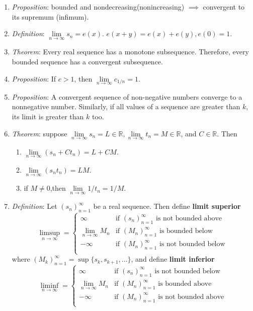 \message{ !name(cheatsheet.tex)}\documentclass{article}
\newcommand{\seqn}[1]{(#1)^\infty_{n=1}}
\newcommand{\real}{\mathbb{R}}
\newcommand{\ntoinf}{\limits_{n\rightarrow\infty}}
\newcommand{\limn}[1]{\lim\ntoinf #1}
\begin{document}
\begin{multicols*}{3}
\begin{enumerate}
		\item \emph{Proposition}: bounded and nondecreasing(nonincreasing)
		      $\implies$ convergent to its supremum (infimum).
		\item \emph{Definition}: $\limn s_n=e(x)$. $e(x+y)=e(x)+e(y),e(0)=1$.
		\item \emph{Theorem}: Every real sequence has a monotone subsequence.
		      Therefore, every bounded sequence has a convergent subsequence.
		\item \emph{Proposition}: If $c>1$, then $\limn{c_{1/n}}=1$.
		\item \emph{Proposition}: A convergent sequence of non-negative numbers
		      converge to a nonnegative number. Similarly, if all values of a
		      sequence are greater than $k$, its limit is greater than $k$ too.
		\item \emph{Theorem}: suppose $\limn s_n=L\in\real, \limn
			      t_n=M\in\real$, and $C\in\real$. Then
		      \begin{enumerate}
			      \item $\limn(s_n+Ct_n)=L+CM$.
			      \item $\limn(s_nt_n)=LM$.
			      \item if $M\neq0$,then $\limn1/t_n=1/M$.
		      \end{enumerate}
		\item \emph{Definition}: Let $\seqn{s_n}$ be a real sequence. Then
		      define \textbf{limit superior} \[\limsup\limits_{n\rightarrow\infty}=
			      \begin{cases}
				      \infty    & \text{if }\seqn{s_n}\text{ is not bounded above} \\
				      \limn M_n & \text{if }\seqn{M_n}\text{ is bounded below}     \\
				      -\infty   & \text{if }\seqn{M_n}\text{ is not bounded below} \\
			      \end{cases}\]
		      where $\seqn{M_k}=\sup\{s_k, s_{k+1},\dots\}$,
		      and define \textbf{limit inferior}
		      \[\liminf\limits_{n\rightarrow\infty}=
			      \begin{cases}
				      \infty    & \text{if }\seqn{s_n}\text{ is not bounded below} \\
				      \limn M_n & \text{if }\seqn{M_n}\text{ is bounded above}     \\
				      -\infty   & \text{if }\seqn{M_n}\text{ is not bounded above} \\
			      \end{cases}\]

\end{enumerate}
\end{multicols*}
\end{document}
